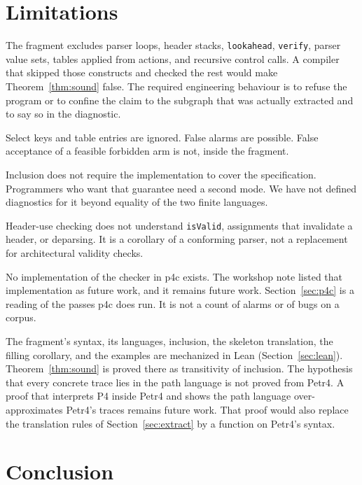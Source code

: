 \documentclass[a4paper,UKenglish,cleveref,autoref]{lipics-v2021}
\begin{document}
\section{Limitations}
\label{sec:limits}

The fragment excludes parser loops, header stacks, \texttt{lookahead}, \texttt{verify}, parser value sets, tables applied from actions, and recursive control calls.
A compiler that skipped those constructs and checked the rest would make Theorem~\ref{thm:sound} false.
The required engineering behaviour is to refuse the program or to confine the claim to the subgraph that was actually extracted and to say so in the diagnostic.

Select keys and table entries are ignored.
False alarms are possible.
False acceptance of a feasible forbidden arm is not, inside the fragment.

Inclusion does not require the implementation to cover the specification.
Programmers who want that guarantee need a second mode.
We have not defined diagnostics for it beyond equality of the two finite languages.

Header-use checking does not understand \texttt{isValid}, assignments that invalidate a header, or deparsing.
It is a corollary of a conforming parser, not a replacement for architectural validity checks.

No implementation of the checker in p4c exists.
The workshop note listed that implementation as future work, and it remains future work.
Section~\ref{sec:p4c} is a reading of the passes p4c does run.
It is not a count of alarms or of bugs on a corpus.

The fragment's syntax, its languages, inclusion, the skeleton translation, the filling corollary, and the examples are mechanized in Lean (Section~\ref{sec:lean}).
Theorem~\ref{thm:sound} is proved there as transitivity of inclusion.
The hypothesis that every concrete trace lies in the path language is not proved from Petr4.
A proof that interprets P4 inside Petr4 and shows the path language over-approximates Petr4's traces remains future work.
That proof would also replace the translation rules of Section~\ref{sec:extract} by a function on Petr4's syntax.

\section{Conclusion}
\label{sec:conc}
\end{document}
